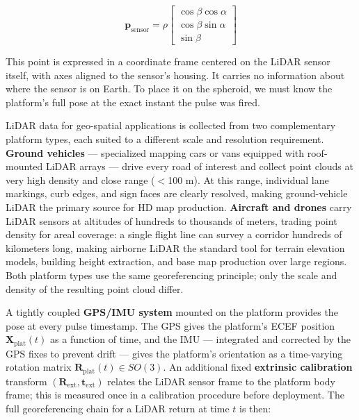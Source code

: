 \documentclass{book}
\begin{document}
\begin{equation}
  \mathbf{p}_{\text{sensor}} =
    \rho \begin{bmatrix}
      \cos\beta\cos\alpha \\
      \cos\beta\sin\alpha \\
      \sin\beta
    \end{bmatrix}
  \label{eq:lidar_return}
\end{equation}

This point is expressed in a coordinate frame centered on the LiDAR
sensor itself, with axes aligned to the sensor's housing.  It carries
no information about where the sensor is on Earth.  To place it on the
spheroid, we must know the platform's full pose at the exact instant
the pulse was fired.

LiDAR data for geo-spatial applications is collected from two
complementary platform types, each suited to a different scale and
resolution requirement.  \textbf{Ground vehicles} --- specialized
mapping cars or vans equipped with roof-mounted LiDAR arrays --- drive
every road of interest and collect point clouds at very high density
and close range ($<$100 m).  At this range, individual lane markings,
curb edges, and sign faces are clearly resolved, making ground-vehicle
LiDAR the primary source for HD map production.
\textbf{Aircraft and drones} carry LiDAR sensors at altitudes of
hundreds to thousands of meters, trading point density for areal
coverage: a single flight line can survey a corridor hundreds of
kilometers long, making airborne LiDAR the standard tool for terrain
elevation models, building height extraction, and base map production
over large regions.  Both platform types use the same georeferencing
principle; only the scale and density of the resulting point cloud
differ.

A tightly coupled \textbf{GPS/IMU system} mounted on the platform
provides the pose at every pulse timestamp.  The GPS gives the
platform's ECEF position $\mathbf{X}_{\text{plat}}(t)$ as a function
of time, and the IMU --- integrated and corrected by the GPS fixes to
prevent drift --- gives the platform's orientation as a time-varying
rotation matrix $\mathbf{R}_{\text{plat}}(t) \in SO(3)$.  An
additional fixed \textbf{extrinsic calibration} transform
$(\mathbf{R}_{\text{ext}}, \mathbf{t}_{\text{ext}})$ relates the
LiDAR sensor frame to the platform body frame; this is measured once
in a calibration procedure before deployment.  The full
georeferencing chain for a LiDAR return at time $t$ is then:
\end{document}
